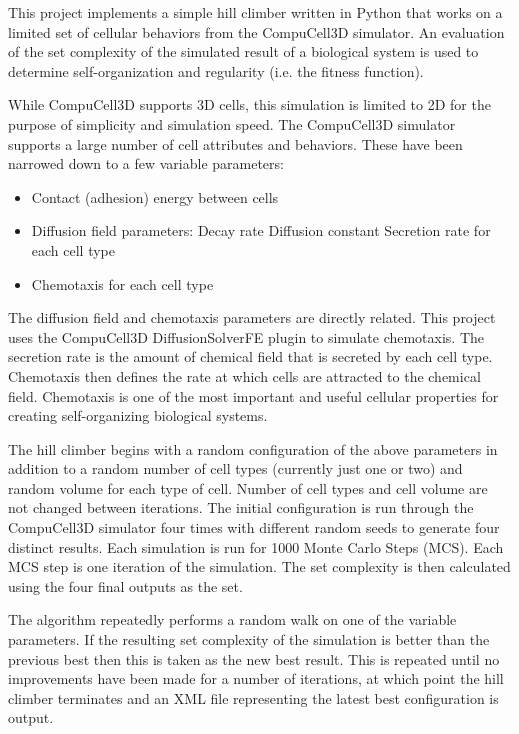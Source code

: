 This project implements a simple hill climber written in Python that works on a limited set of cellular behaviors from the CompuCell3D simulator. An evaluation of the set complexity of the simulated result of a biological system is used to determine self-organization and regularity (i.e. the fitness function).

While CompuCell3D supports 3D cells, this simulation is limited to 2D for the purpose of simplicity and simulation speed. The CompuCell3D simulator supports a large number of cell attributes and behaviors. These have been narrowed down to a few variable parameters:

\begin{itemize}
	\item Contact (adhesion) energy between cells
	\item Diffusion field parameters:
		\subitem Decay rate
		\subitem Diffusion constant
		\subitem Secretion rate for each cell type
	\item Chemotaxis for each cell type
\end{itemize}

The diffusion field and chemotaxis parameters are directly related. This project uses the CompuCell3D DiffusionSolverFE plugin to simulate chemotaxis. The secretion rate is the amount of chemical field that is secreted by each cell type. Chemotaxis then defines the rate at which cells are attracted to the chemical field. Chemotaxis is one of the most important and useful cellular properties for creating self-organizing biological systems.

The hill climber begins with a random configuration of the above parameters in addition to a random number of cell types (currently just one or two) and random volume for each type of cell. Number of cell types and cell volume are not changed between iterations. The initial configuration is run through the CompuCell3D simulator four times with different random seeds to generate four distinct results. Each simulation is run for 1000 Monte Carlo Steps (MCS). Each MCS step is one iteration of the simulation. The set complexity is then calculated using the four final outputs as the set.

The algorithm repeatedly performs a random walk on one of the variable parameters. If the resulting set complexity of the simulation is better than the previous best then this is taken as the new best result. This is repeated until no improvements have been made for a number of iterations, at which point the hill climber terminates and an XML file representing the latest best configuration is output.

